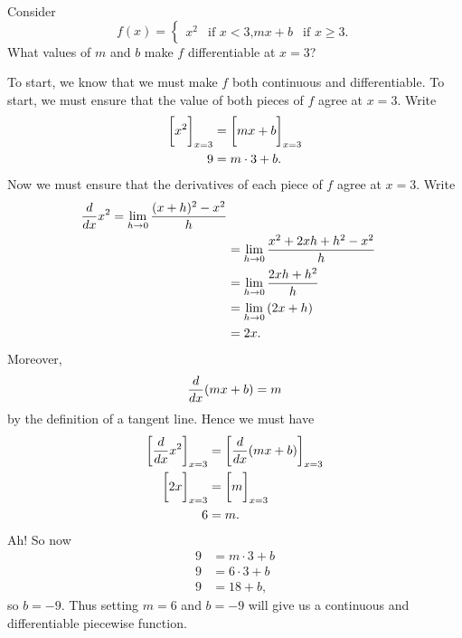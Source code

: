 \documentclass{ximera}
\begin{document}
\begin{example}
  Consider
  \[
  f(x) = \begin{cases}
    x^2 &\text{if $x<3$,}
    mx+b &\text{if $x\ge 3$.}
  \end{cases}
  \]
  What values of $m$ and $b$ make $f$ differentiable at $x=3$?
  \begin{explanation}
    To start, we know that we must make $f$ both continuous and
    differentiable. To start, we must ensure that the value of both
    pieces of $f$ agree at $x=3$. Write
    \begin{align*}
      \bigg[ x^2 \bigg]_{x=3} &= \bigg[ mx+b \bigg]_{x=3}\\
      9 &= m\cdot 3 + b.
    \end{align*}
    Now we must ensure that the derivatives of each piece of $f$ agree
    at $x=3$. Write
    \begin{align*}
    \frac{d}{dx} x^2 = \lim_{h\to 0}\frac{(x+h)^2-x^2}{h}\\
    &= \lim_{h\to 0}\frac{x^2 + 2xh + h^2 - x^2}{h}\\
    &= \lim_{h\to 0}\frac{2xh + h^2}{h}\\
    &= \lim_{h\to 0}\left(2x + h\right)\\
    &=2x.
    \end{align*}
    Moreover,
    \[
    \frac{d}{dx}(mx+ b) = m
    \]
    by the definition of a tangent line. Hence we must have
    \begin{align*}
      \bigg[ \frac{d}{dx} x^2 \bigg]_{x=3} &= \bigg[ \frac{d}{dx}(mx+b) \bigg]_{x=3}\\
      \bigg[ 2x \bigg]_{x=3} &= \bigg[ m \bigg]_{x=3}\\
      6 &= m.
    \end{align*}
    Ah! So now
    \begin{align*}
      9 &= m\cdot 3 + b\\
      9 &= 6\cdot 3 + b\\
      9 &= 18 + b,
    \end{align*}
    so $b=-9$. Thus setting $m=6$ and $b=-9$ will give us a continuous
    and differentiable piecewise function.
  \end{explanation}
\end{example}
\end{document}
